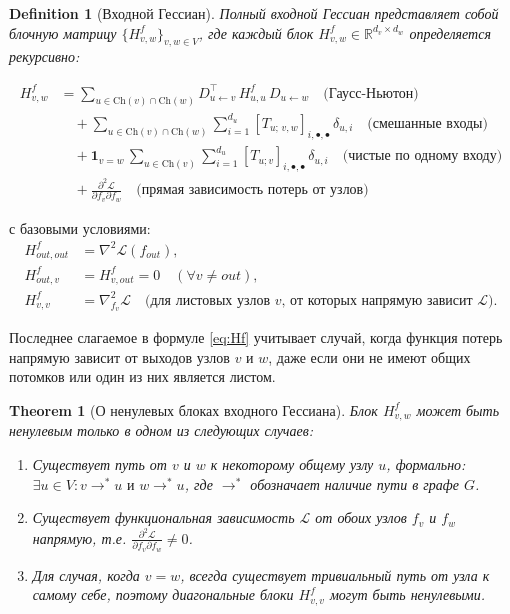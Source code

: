 \documentclass[11pt]{article}
\newtheorem{theorem}{Theorem}
\newtheorem{definition}{Definition}
\newcommand{\Ch}{\mathrm{Ch}} %
\begin{document}
\begin{definition}[Входной Гессиан]
  Полный входной Гессиан представляет собой блочную матрицу $\{H^f_{v,w}\}_{v,w\in V}$, где каждый блок
  $H^f_{v,w}\in\mathbb{R}^{d_v\times d_w}$ определяется рекурсивно:
\end{definition}

\begin{equation}\label{eq:Hf}
  \boxed{
    \begin{split}
      H^f_{v,w}
      &=
      \sum_{u\in\Ch(v)\cap\Ch(w)}
      D_{u\gets v}^\top\,H^f_{u,u}\,D_{u\gets w}
      \quad\text{(Гаусс-Ньютон)}\\
      &\quad+
      \sum_{u\in\Ch(v)\cap\Ch(w)}
      \sum_{i=1}^{d_u}
      [T_{u;\,v,w}]_{i,\bullet,\bullet}\,\delta_{u,i}
      \quad\text{(смешанные входы)}\\
      &\quad+
      \mathbf{1}_{v=w}\,
      \sum_{u\in\Ch(v)}
      \sum_{i=1}^{d_u}
      [T_{u;v}]_{i,\bullet,\bullet}\,\delta_{u,i}
      \quad\text{(чистые по одному входу)}\\
      &\quad+
      \frac{\partial^2 \mathcal{L}}{\partial f_v \partial f_w}
      \quad\text{(прямая зависимость потерь от узлов)}
    \end{split}
  }
\end{equation}

с базовыми условиями:
\begin{align}
  H^f_{out,out} &= \nabla^2\mathcal L(f_{out}), \nonumber\\
  H^f_{out,v} &= H^f_{v,out} = 0\quad (\forall v\neq out), \nonumber\\
  H^f_{v,v} &= \nabla^2_{f_v}\mathcal{L} \quad \text{(для листовых узлов $v$, от которых напрямую зависит
  $\mathcal{L}$)}. \nonumber
\end{align}

Последнее слагаемое в формуле \eqref{eq:Hf} учитывает случай, когда функция потерь напрямую зависит от
выходов узлов $v$ и $w$, даже если они не имеют общих потомков или один из них является листом.

\begin{theorem}[О ненулевых блоках входного Гессиана]
  Блок $H^f_{v,w}$ может быть ненулевым только в одном из следующих случаев:
  \begin{enumerate}
    \item Существует путь от $v$ и $w$ к некоторому общему узлу $u$, формально: $\exists u \in V: v
      \rightarrow^* u \text{ и } w \rightarrow^* u$, где $\rightarrow^*$ обозначает наличие пути в графе $G$.
    \item Существует функциональная зависимость $\mathcal{L}$ от обоих узлов $f_v$ и $f_w$ напрямую, т.е.
      $\frac{\partial^2 \mathcal{L}}{\partial f_v \partial f_w} \neq 0$.
    \item Для случая, когда $v = w$, всегда существует тривиальный путь от узла к самому себе, поэтому
      диагональные блоки $H^f_{v,v}$ могут быть ненулевыми.
  \end{enumerate}
\end{theorem}
\end{document}
